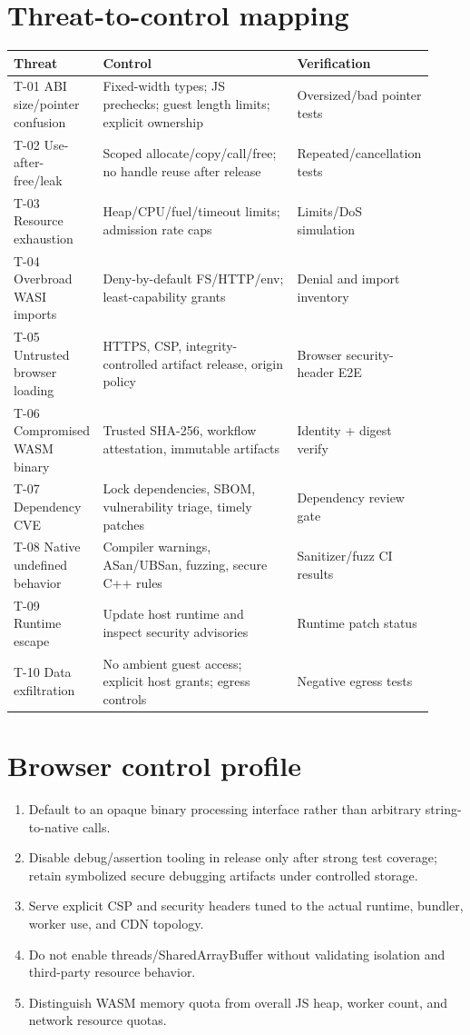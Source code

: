 \documentclass[11pt,letterpaper]{article}
\begin{document}
\section{Threat-to-control mapping}
\begin{longtable}{>{\raggedright\arraybackslash}p{0.20\linewidth}>{\raggedright\arraybackslash}p{0.46\linewidth}>{\raggedright\arraybackslash}p{0.26\linewidth}}
\toprule Threat & Control & Verification \\ \midrule \endhead
T-01 ABI size/pointer confusion & Fixed-width types; JS prechecks; guest length limits; explicit ownership & Oversized/bad pointer tests \\
T-02 Use-after-free/leak & Scoped allocate/copy/call/free; no handle reuse after release & Repeated/cancellation tests \\
T-03 Resource exhaustion & Heap/CPU/fuel/timeout limits; admission rate caps & Limits/DoS simulation \\
T-04 Overbroad WASI imports & Deny-by-default FS/HTTP/env; least-capability grants & Denial and import inventory \\
T-05 Untrusted browser loading & HTTPS, CSP, integrity-controlled artifact release, origin policy & Browser security-header E2E \\
T-06 Compromised WASM binary & Trusted SHA-256, workflow attestation, immutable artifacts & Identity + digest verify \\
T-07 Dependency CVE & Lock dependencies, SBOM, vulnerability triage, timely patches & Dependency review gate \\
T-08 Native undefined behavior & Compiler warnings, ASan/UBSan, fuzzing, secure C++ rules & Sanitizer/fuzz CI results \\
T-09 Runtime escape & Update host runtime and inspect security advisories & Runtime patch status \\
T-10 Data exfiltration & No ambient guest access; explicit host grants; egress controls & Negative egress tests \\
\bottomrule
\end{longtable}

\section{Browser control profile}
\begin{enumerate}
\item Default to an opaque binary processing interface rather than arbitrary string-to-native calls.
\item Disable debug/assertion tooling in release only after strong test coverage; retain symbolized secure debugging artifacts under controlled storage.
\item Serve explicit CSP and security headers tuned to the actual runtime, bundler, worker use, and CDN topology.
\item Do not enable threads/SharedArrayBuffer without validating isolation and third-party resource behavior.
\item Distinguish WASM memory quota from overall JS heap, worker count, and network resource quotas.
\end{enumerate}
\end{document}
